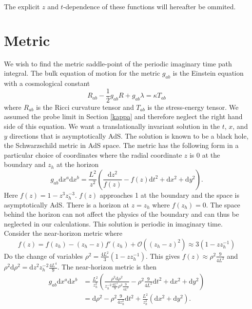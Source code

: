 \documentclass[12pt]{report}
\renewcommand{\d}{\ensuremath{\mathrm{d}}}
\begin{document}
The explicit $z$ and $t$-dependence of these functions will hereafter be ommited. 
\section{Metric}
We wish to find the metric saddle-point of the periodic imaginary time path integral. The bulk equation of motion for the metric $g_{ab}$ is the Einstein equation with a cosmological constant
\begin{equation}
R_{ab}-\frac{1}{2}g_{ab}R+g_{ab}\lambda=\kappa T_{ab}\label{einstein}
\end{equation}
where $R_{ab}$ is the Ricci curvature tensor and $T_{ab}$ is the stress-energy tensor. We assumed the probe limit in Section \ref{kappa} and therefore neglect the right hand side of this equation. We want a translationally invariant solution in the $t$, $x$, and $y$ directions that is asymptotically AdS. The solution is known to be a black hole\cite{McGreevy:2009xe}, the Schwarzschild metric in AdS space. The metric has the following form in a particular choice of coordinates where the radial coordinate $z$ is 0 at the boundary and $z_h$ at the horizon
\begin{equation}
 g_{ab}\d x^a\d x^b=\frac{L^2}{z^2}\left(\frac{\d z^2}{f(z)}-f(z)\d t^2+\d x^2+\d y^2\right).\label{metric}
\end{equation}
Here $f(z)=1-z^3z_h^{-3}$. $f(z)$ approaches 1 at the boundary and the space is asymptotically AdS. There is a horizon at $z=z_h$ where $f(z_h)=0$. The space behind the horizon can not affect the physics of the boundary and can thus be neglected in our calculations. This solution is periodic in imaginary time. Consider the near-horizon metric where
\begin{equation}
  f(z)=f(z_h)-(z_h-z)f'(z_h)+\mathcal{O}((z_h-z)^2)\approx 3(1-zz_h^{-1})
\end{equation}
Do the change of variables $\rho^2=\frac{4L^2}{3}(1-zz_h^{-1})$. This gives $f(z)\approx \rho^2\frac{9}{4L^2}$ and $\rho^2\d \rho^2=\d z^2 z_h^{-2}\frac{4L^4}{9}$. The near-horizon metric is then
\begin{equation}
\begin{split}
 g_{ab}\d x^a\d x^b&=\frac{L^2}{z_h^2}\left(\frac{\rho^2\d \rho^2  }{z_h^{-2}\frac{4L^4}{9}\rho^2\frac{9}{4L^2}}-\rho^2\frac{9}{4L^2}\d t^2+\d x^2+\d y^2\right)\\
&= \d \rho^2 -\rho^2\frac{9}{4z_h^2}\d t^2+\frac{L^2}{z_h^2}\left(\d x^2+\d y^2\right).
\end{split}
\end{equation}
\end{document}
